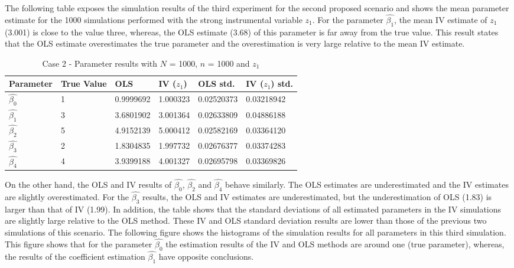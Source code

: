 \documentclass{article}
\begin{document}
\newline
The following table exposes the simulation results of the third experiment for the second proposed scenario and shows the mean parameter estimate for the 1000 simulations performed with the strong instrumental variable $z_{1}$. For the parameter $\hat{\beta_{1}}$, the mean IV estimate of $z_{1}$ (3.001) is close to the value three, whereas, the OLS estimate (3.68) of this parameter is far away from the true value. This result states that the OLS estimate overestimates the true parameter and the overestimation is very large relative to the mean IV estimate.
\newline
\begin{table}[h!]
\centering
\begin{tabular}{ | m{2cm} | m{2cm}|  m{2cm}| m{2cm}|  m{2cm}| m{2cm}|} 
  \hline
  Parameter & True Value & OLS & IV ($z_{1}$) & OLS std. & IV ($z_{1}$) std.\\ 
  \hline
  $\hat{\beta_{0}}$ & 1 & 0.9999692 & 1.000323 & 0.02520373 & 0.03218942\\ 
  \hline
  $\hat{\beta_{1}}$ & 3 & 3.6801902 & 3.001364 & 0.02633809 & 0.04886188 \\
  \hline
  $\hat{\beta_{2}}$ & 5 & 4.9152139 & 5.000412 & 0.02582169 & 0.03364120 \\
  \hline
  $\hat{\beta_{3}}$ & 2 & 1.8304835 & 1.997732 & 0.02676377 & 0.03374283 \\
  \hline
  $\hat{\beta_{4}}$ & 4 & 3.9399188 & 4.001327 & 0.02695798 & 0.03369826 \\
  \hline
\end{tabular}
\caption{Case 2 - Parameter results with $N$ = 1000, $n$ = 1000 and $z_{1}$}
\label{table:8}
\end{table}
\newline
On the other hand, the OLS and IV results of $\hat{\beta_{0}}$, $\hat{\beta_{2}}$ and $\hat{\beta_{4}}$ behave similarly. The OLS estimates are underestimated and the IV estimates are slightly overestimated. For the $\hat{\beta_{3}}$ results, the OLS and IV estimates are underestimated, but the underestimation of OLS (1.83) is larger than that of IV (1.99).
In addition, the table shows that the standard deviations of all estimated parameters in the IV simulations are slightly large relative to the OLS method. These IV and OLS standard deviation results are lower than those of the previous two simulations of this scenario.
\newline
The following figure shows the histograms of the simulation results for all parameters in this third simulation. This figure shows that for the parameter $\hat{\beta_{0}}$ the estimation results of the IV and OLS methods are around one (true parameter), whereas, the results of the coefficient estimation $\hat{\beta_{1}}$ have opposite conclusions.
\end{document}
